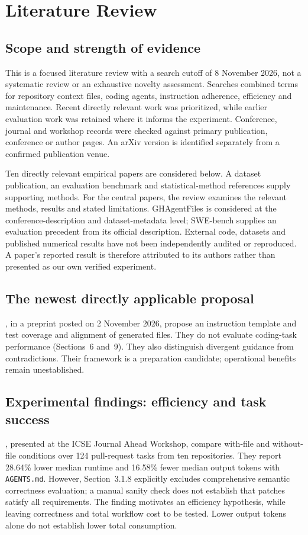 \section{Literature Review}
\label{sec:literature}

\subsection{Scope and strength of evidence}
This is a focused literature review with a search cutoff of 8 November 2026,
not a systematic review or an exhaustive novelty assessment. Searches combined
terms for repository context files, coding agents, instruction adherence,
efficiency and maintenance. Recent directly relevant work was prioritized,
while earlier evaluation work was retained where it informs the experiment.
Conference, journal and workshop records were checked against primary
publication, conference or author pages. An arXiv version is identified
separately from a confirmed publication venue.

Ten directly relevant empirical papers are considered below. A dataset
publication, an evaluation benchmark and statistical-method references supply
supporting methods. For the
central papers, the review examines the relevant methods, results and stated
limitations. GHAgentFiles is considered at the conference-description and
dataset-metadata level; SWE-bench supplies an evaluation precedent from its
official description. External code, datasets and published numerical results
have not been independently audited or reproduced. A paper's reported result
is therefore attributed to its authors rather than presented as our own
verified experiment.

\subsection{The newest directly applicable proposal}
\label{sec:template}
\citet{shanto2026}, in a preprint posted on 2 November 2026, propose an instruction
template and test coverage and alignment of generated files. They do not evaluate
coding-task performance (Sections~6 and~9). They also distinguish divergent
guidance from contradictions. Their framework is a preparation candidate;
operational benefits remain unestablished.

\subsection{Experimental findings: efficiency and task success}
\label{sec:experiments}
\citet{lulla2026}, presented at the ICSE Journal Ahead Workshop, compare
with-file and without-file conditions over 124 pull-request tasks from ten
repositories. They report 28.64\% lower median runtime and 16.58\% fewer median
output tokens with \texttt{AGENTS.md}. However, Section~3.1.8 explicitly excludes
comprehensive semantic correctness evaluation; a manual sanity check does not
establish that patches satisfy all requirements. The finding motivates an
efficiency hypothesis, while leaving correctness and total workflow cost to be
tested. Lower output tokens alone do not establish lower total consumption.

